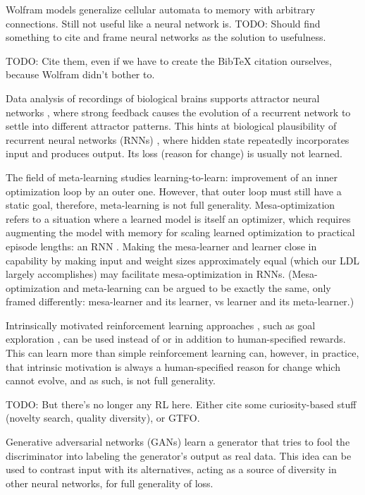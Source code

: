 \documentclass{article}
\begin{document}
Wolfram models generalize cellular automata to memory with arbitrary connections. Still not useful like a neural network is. TODO: Should find something to cite and frame neural networks as the solution to usefulness.

    TODO: Cite them, even if we have to create the BibTeX citation ourselves, because Wolfram didn't bother to.

Data analysis of recordings of biological brains supports attractor neural networks \cite{AMIT1990111}, where strong feedback causes the evolution of a recurrent network to settle into different attractor patterns. This hints at biological plausibility of recurrent neural networks (RNNs) \cite{1986Natur.323.533R}, where hidden state repeatedly incorporates input and produces output. Its loss (reason for change) is usually not learned.

The field of meta-learning studies learning-to-learn: improvement of an inner optimization loop by an outer one. However, that outer loop must still have a static goal, therefore, meta-learning is not full generality. Mesa-optimization \cite{hubinger2019risks} refers to a situation where a learned model is itself an optimizer, which requires augmenting the model with memory for scaling learned optimization to practical episode lengths: an RNN \cite{Ravi2017OptimizationAA}. Making the mesa-learner and learner close in capability by making input and weight sizes approximately equal (which our LDL largely accomplishes) may facilitate mesa-optimization in RNNs. (Mesa-optimization and meta-learning can be argued to be exactly the same, only framed differently: mesa-learner and its learner, vs learner and its meta-learner.)

Intrinsically motivated reinforcement learning approaches \cite{6294131}, such as goal exploration \cite{DBLP:journals/corr/abs-1708-02190}, can be used instead of or in addition to human-specified rewards. This can learn more than simple reinforcement learning can, however, in practice, that intrinsic motivation is always a human-specified reason for change which cannot evolve, and as such, is not full generality.

    TODO: But there's no longer any RL here. Either cite some curiosity-based stuff (novelty search, quality diversity), or GTFO.

Generative adversarial networks (GANs) \cite{goodfellow2014generative} learn a generator that tries to fool the discriminator into labeling the generator's output as real data. This idea can be used to contrast input with its alternatives, acting as a source of diversity in other neural networks, for full generality of loss.
\end{document}
